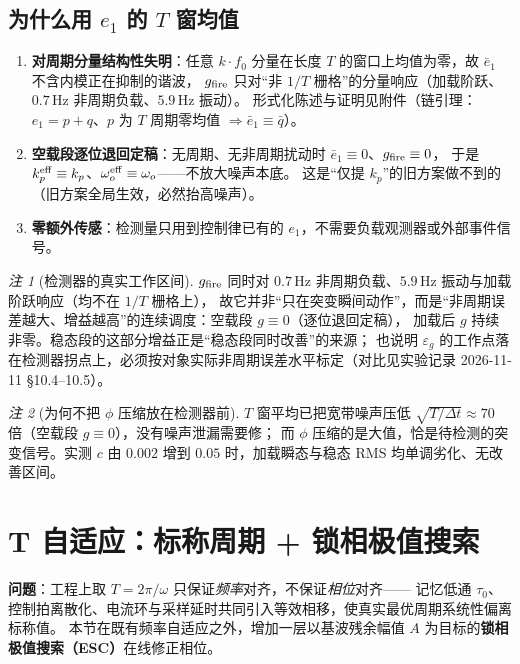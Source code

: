 \documentclass[11pt,a4paper]{article}
\theoremstyle{remark}\newtheorem{remark}{注}
\begin{document}
\subsection{为什么用 $e_1$ 的 $T$ 窗均值}\label{sec:lawd-why}
\begin{enumerate}
  \item \textbf{对周期分量结构性失明}：任意 $k\cdot f_0$ 分量在长度 $T$ 的窗口上均值为零，故 $\bar e_1$ 不含内模正在抑制的谐波，
        $g_{\rm fire}$ 只对“非 $1/T$ 栅格”的分量响应（加载阶跃、$0.7$\,Hz 非周期负载、$5.9$\,Hz 振动）。
        形式化陈述与证明见附件（链引理：$e_1=p+q$、$p$ 为 $T$ 周期零均值 $\Rightarrow \bar e_1\equiv\bar q$）。
  \item \textbf{空载段逐位退回定稿}：无周期、无非周期扰动时 $\bar e_1\equiv0$、$g_{\rm fire}\equiv0$，
        于是 $k_p^{\rm eff}\equiv k_p$、$\omega_o^{\rm eff}\equiv\omega_o$——不放大噪声本底。
        这是“仅提 $k_p$”的旧方案做不到的（旧方案全局生效，必然抬高噪声）。
  \item \textbf{零额外传感}：检测量只用到控制律已有的 $e_1$，不需要负载观测器或外部事件信号。
\end{enumerate}
\begin{remark}[检测器的真实工作区间]\label{rem:lawd-range}
$g_{\rm fire}$ 同时对 $0.7$\,Hz 非周期负载、$5.9$\,Hz 振动与加载阶跃响应（均不在 $1/T$ 栅格上），
故它并非“只在突变瞬间动作”，而是“非周期误差越大、增益越高”的连续调度：空载段 $g\equiv0$（逐位退回定稿），
加载后 $g$ 持续非零。稳态段的这部分增益正是“稳态段同时改善”的来源；
也说明 $\varepsilon_g$ 的工作点落在检测器拐点上，必须按对象实际非周期误差水平标定（对比见实验记录 2026-11-11 §10.4--10.5）。
\end{remark}
\begin{remark}[为何不把 $\phi$ 压缩放在检测器前]\label{rem:lawd-phi}
$T$ 窗平均已把宽带噪声压低 $\sqrt{T/\Delta t}\approx70$ 倍（空载段 $g\equiv0$），没有噪声泄漏需要修；
而 $\phi$ 压缩的是大值，恰是待检测的突变信号。实测 $c$ 由 $0.002$ 增到 $0.05$ 时，加载瞬态与稳态 RMS 均单调劣化、无改善区间。
\end{remark}

\section{T 自适应：标称周期 + 锁相极值搜索}\label{sec:tes}
\noindent\textbf{问题}：工程上取 $T=2\pi/\omega$ 只保证\emph{频率}对齐，不保证\emph{相位}对齐——
记忆低通 $\tau_0$、控制拍离散化、电流环与采样延时共同引入等效相移，使真实最优周期系统性偏离标称值。
本节在既有频率自适应之外，增加一层以基波残余幅值 $A$ 为目标的\textbf{锁相极值搜索（ESC）}在线修正相位。
\end{document}
